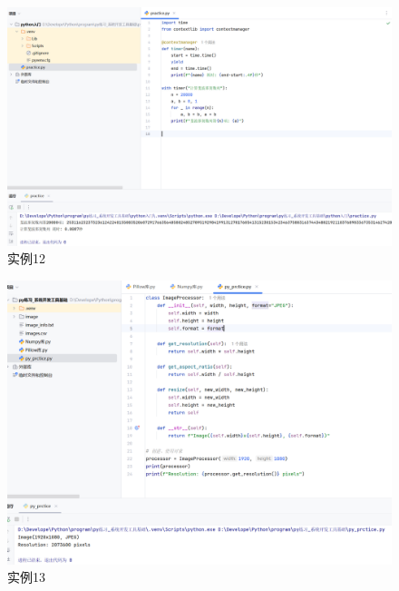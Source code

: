 \documentclass[cn,12pt]{report}
\begin{document}
{      \begin{figure}[htbp]
    \centering
    \includegraphics[width=1\textwidth]{image/20.png}
    \caption{实例12}
  \end{figure}
\FloatBarrier
   
      \begin{figure}[htbp]
    \centering
    \includegraphics[width=1\textwidth]{image/9.png}
    \caption{实例13}
  \end{figure}
\FloatBarrier
   
}
\end{document}
